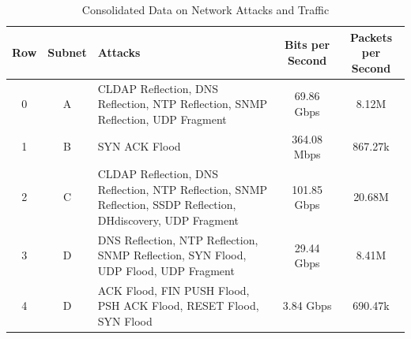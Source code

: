 



\begin{table}[ht]
    \centering
    \begin{tabular}{|c|c|p{5cm}|c|c|}
    \hline
    \textbf{Row} & \textbf{Subnet} & \textbf{Attacks} & \textbf{Bits per Second} & \textbf{Packets per Second} \\ \hline
    0 & A & CLDAP Reflection, DNS Reflection, NTP Reflection, SNMP Reflection, UDP Fragment & 69.86 Gbps & 8.12M \\ \hline
    1 & B & SYN ACK Flood & 364.08 Mbps & 867.27k \\ \hline
    2 & C & CLDAP Reflection, DNS Reflection, NTP Reflection, SNMP Reflection, SSDP Reflection, DHdiscovery, UDP Fragment & 101.85 Gbps & 20.68M \\ \hline
    3 & D & DNS Reflection, NTP Reflection, SNMP Reflection, SYN Flood, UDP Flood, UDP Fragment & 29.44 Gbps & 8.41M \\ \hline
    4 & D & ACK Flood, FIN PUSH Flood, PSH ACK Flood, RESET Flood, SYN Flood & 3.84 Gbps & 690.47k \\ \hline
    \end{tabular}
    \caption{Consolidated Data on Network Attacks and Traffic}
    \label{table:network-attacks}
    \end{table}